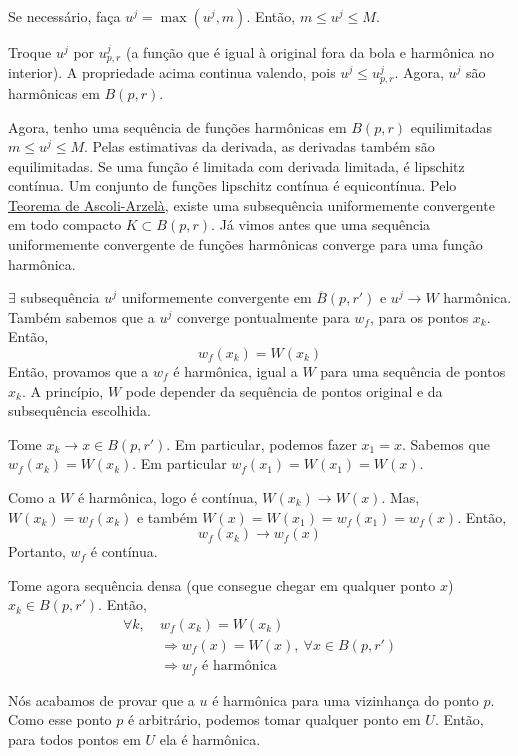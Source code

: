 \documentclass[11pt]{article}
\begin{document}
Se necessário, faça \(u^j = \max(u^j, m)\). Então, \(m \leq u^j \leq M\).

Troque \(u^j\) por \(u^j_{p,r}\) (a função que é igual à original fora da bola e harmônica no interior). A propriedade acima continua valendo, pois \(u^j \leq u^j_{p,r}\). Agora, \(u^j\) são harmônicas em \(B(p,r)\).

Agora, tenho uma sequência de funções harmônicas em \(B(p,r)\) equilimitadas \(m \leq u^j \leq M\). Pelas estimativas da derivada, as derivadas também são equilimitadas. Se uma função é limitada com derivada limitada, é lipschitz contínua. Um conjunto de funções lipschitz contínua é equicontínua. Pelo \href{https://en.wikipedia.org/wiki/Arzel\%C3\%A0\%E2\%80\%93Ascoli_theorem}{Teorema de Ascoli-Arzelà}, existe uma subsequência uniformemente convergente em todo compacto \(K \subset B(p,r)\). Já vimos antes que uma sequência uniformemente convergente de funções harmônicas converge para uma função harmônica.

\(\exists\) subsequência \(u^j\) uniformemente convergente em \(\overline{B}(p, r')\) e \(u^j \rightarrow W\) harmônica. Também sabemos que a \(u^j\) converge pontualmente para \(w_f\), para os pontos \(x_k\). Então, \[w_f(x_k) = W(x_k)\]Então, provamos que a \(w_f\) é harmônica, igual a \(W\) para uma sequência de pontos \(x_k\). A princípio,  \(W\) pode depender da sequência de pontos original e da subsequência escolhida.

\medskip

Tome \(x_k \rightarrow x \in B(p, r')\). Em particular, podemos fazer \(x_1 = x\). Sabemos que \(w_f(x_k) = W(x_k)\). Em particular \(w_f(x_1)=W(x_1)=W(x)\).

Como a \(W\) é harmônica, logo é contínua, \(W(x_k)\rightarrow W(x)\). Mas, \(W(x_k) = w_f(x_k)\) e também \(W(x) = W(x_1)=w_f(x_1) = w_f(x)\). Então, \[w_f(x_k) \rightarrow w_f(x)\] Portanto, \(w_f\) é contínua.

Tome agora sequência densa (que consegue chegar em qualquer ponto \(x\)) \(x_k \in B(p,r')\). Então,\vspace{-4mm} \begin{align*}
	\forall k,\ & w_f(x_k)=W(x_k) \\
	&\Rightarrow w_f(x) = W(x),\ \forall x \in B(p, r')\\
	&\Rightarrow w_f \text{ é harmônica}
\end{align*} 

Nós acabamos de provar que a \(u\) é harmônica para uma vizinhança do ponto \(p\). Como esse ponto \(p\) é arbitrário, podemos tomar qualquer ponto em \(U\). Então, para todos pontos em \(U\) ela é harmônica.
\end{document}
